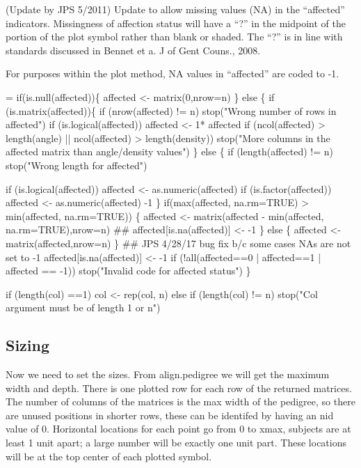 \documentclass{article}
\begin{document}
(Update by JPS 5/2011) Update to allow missing values (NA) in the ``affected''
indicators.  Missingness of affection status will have a ``?'' in 
the midpoint of the portion of the plot symbol rather than blank or shaded.
The ``?'' is in line with standards discussed in 
Bennet et a. J of Gent Couns., 2008.

For purposes within the plot method, NA values in ``affected'' are coded 
to -1.

\begin{nwchunk}
=
 if(is.null(affected))\{
   affected <- matrix(0,nrow=n)
 \}
 else \{
     if (is.matrix(affected))\{
         if (nrow(affected) != n) stop("Wrong number of rows in affected")
         if (is.logical(affected)) affected <- 1* affected
         if (ncol(affected) > length(angle) || ncol(affected) > length(density))
             stop("More columns in the affected matrix than angle/density values")
         \} 
     else \{
         if (length(affected) != n)
             stop("Wrong length for affected")
 
         if (is.logical(affected)) affected <- as.numeric(affected)
         if (is.factor(affected))  affected <- as.numeric(affected) -1
         \}
     if(max(affected, na.rm=TRUE) > min(affected, na.rm=TRUE)) \{
       affected <- matrix(affected - min(affected, na.rm=TRUE),nrow=n)
      ## affected[is.na(affected)] <- -1
     \} else \{
       affected <- matrix(affected,nrow=n)
     \}
     ## JPS 4/28/17 bug fix b/c some cases NAs are not set to -1
     affected[is.na(affected)] <- -1
     if (!all(affected==0 | affected==1 | affected == -1))
             stop("Invalid code for affected status")
 \}
 
 if (length(col) ==1) col <- rep(col, n)
 else if (length(col) != n) stop("Col argument must be of length 1 or n")
\end{nwchunk}

\subsection{Sizing}
Now we need to set the sizes. 
From align.pedigree we will get the maximum width and depth. 
There is one plotted row for each row of the returned matrices.
The number of columns of the matrices is the max width of the pedigree,
so there are unused positions in shorter rows, these can be identifed
by having an nid value of 0.
Horizontal locations for each point go from 0 to xmax, subjects are at
least 1 unit apart; a large number will be exactly one unit part.
These locations will be at the top center of each plotted symbol.
\end{document}

